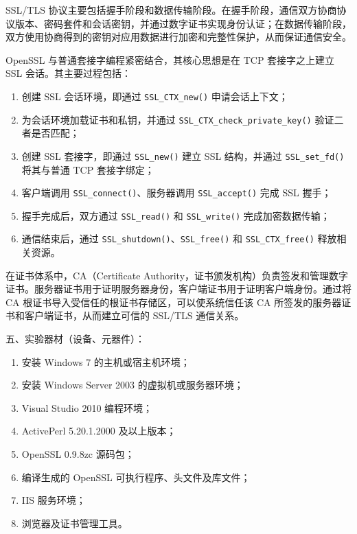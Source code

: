 ﻿\documentclass[12pt]{ctexart}
\begin{document}
SSL/TLS 协议主要包括握手阶段和数据传输阶段。在握手阶段，通信双方协商协议版本、密码套件和会话密钥，并通过数字证书实现身份认证；在数据传输阶段，双方使用协商得到的密钥对应用数据进行加密和完整性保护，从而保证通信安全。

OpenSSL 与普通套接字编程紧密结合，其核心思想是在 TCP 套接字之上建立 SSL 会话。其主要过程包括：

\begin{enumerate}
    \item 创建 SSL 会话环境，即通过 \verb|SSL_CTX_new()| 申请会话上下文；
    \item 为会话环境加载证书和私钥，并通过 \verb|SSL_CTX_check_private_key()| 验证二者是否匹配；
    \item 创建 SSL 套接字，即通过 \verb|SSL_new()| 建立 SSL 结构，并通过 \verb|SSL_set_fd()| 将其与普通 TCP 套接字绑定；
    \item 客户端调用 \verb|SSL_connect()|、服务器调用 \verb|SSL_accept()| 完成 SSL 握手；
    \item 握手完成后，双方通过 \verb|SSL_read()| 和 \verb|SSL_write()| 完成加密数据传输；
    \item 通信结束后，通过 \verb|SSL_shutdown()|、\verb|SSL_free()| 和 \verb|SSL_CTX_free()| 释放相关资源。
\end{enumerate}

在证书体系中，CA（Certificate Authority，证书颁发机构）负责签发和管理数字证书。服务器证书用于证明服务器身份，客户端证书用于证明客户端身份。通过将 CA 根证书导入受信任的根证书存储区，可以使系统信任该 CA 所签发的服务器证书和客户端证书，从而建立可信的 SSL/TLS 通信关系。

\vspace{0.5em}

{\heiti{} 五、实验器材（设备、元器件）：}

\begin{enumerate}
    \item 安装 Windows 7 的主机或宿主机环境；
    \item 安装 Windows Server 2003 的虚拟机或服务器环境；
    \item Visual Studio 2010 编程环境；
    \item ActivePerl 5.20.1.2000 及以上版本；
    \item OpenSSL 0.9.8zc 源码包；
    \item 编译生成的 OpenSSL 可执行程序、头文件及库文件；
    \item IIS 服务环境；
    \item 浏览器及证书管理工具。
\end{enumerate}
\end{document}
